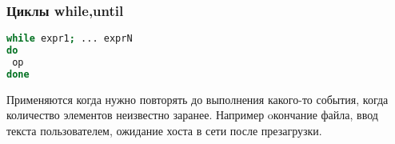 \begin{frame}[fragile]
\frametitle{Циклы while,until}
\begin{lstlisting}[language=sh,frame=single]
while expr1; ... exprN
do
 op
done
\end{lstlisting}
Применяются когда нужно повторять до выполнения какого-то события, когда количество элементов неизвестно заранее. Например oкончание файла, ввод текста пользователем, ожидание хоста в сети после презагрузки. 
\end{frame}
